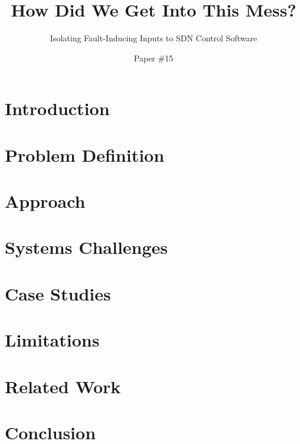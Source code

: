 \documentclass{sig-alt-hotnets}
\begin{document}
    \date{}

\title{How Did We Get Into This Mess?}
\subtitle{Isolating Fault-Inducing Inputs to SDN Control Software}

\author{Paper \#15}

\date{}
    \maketitle
    \thispagestyle{empty}

\abstract{{\it }}

\section{Introduction}
\label{sec:intro}


\section{Problem Definition}
\label{sec:formalism}


\section{Approach}
\label{sec:approach}


\section{Systems Challenges}
\label{sec:systems_challenges}


\section{Case Studies}
\label{sec:casestudies}


\section{Limitations}
\label{sec:limitations}


\section{Related Work}
\label{sec:related_work}


\section{Conclusion}
\label{sec:conclusion}


 \small 

%
\end{document}
